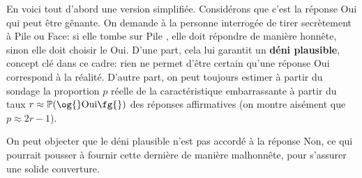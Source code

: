 \documentclass[a4paper,11pt]{article} %
\begin{document}
En voici tout d'abord une version simplifiée.
Considérons que c'est la réponse \og Oui\fg{} qui peut être gênante. 
On demande à la personne interrogée de tirer secrètement à \og Pile ou Face\fg{}: si elle tombe sur \og Pile \fg{}, elle doit répondre de manière honnête, sinon elle doit choisir le \og Oui\fg{}.
D'une part, cela lui garantit un \textbf{déni plausible}, concept clé dans ce cadre: rien ne permet d'être certain qu'une réponse \og Oui\fg{} correspond à la réalité.
D'autre part, on peut toujours estimer à partir du sondage la proportion $p$ réelle de la caractéristique embarrassante à partir du taux $r\approx\mathbb{P}(\text{\og{}Oui\fg{}})$ des réponses affirmatives (on montre aisément que $p\approx2r-1$).
\begin{center}
\end{center}
On peut objecter que le déni plausible n'est pas accordé à la réponse \og Non\fg{}, ce qui pourrait pousser à fournir cette dernière de manière malhonnête, pour s'assurer une solide couverture. 
\end{document}
